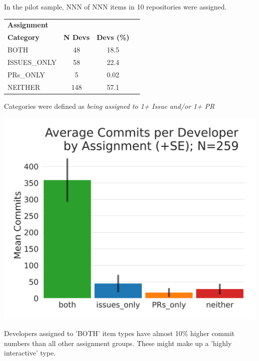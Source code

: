 \documentclass[25pt, a0paper, landscape, margin=10mm, innermargin=15mm, blockverticalspace=10mm, subcolspace=7mm, dvipsnames]{tikzposter} %
\begin{document}
\begin{columns}
{\begin{multicols}{2}
{    In the pilot sample, NNN of NNN items in 10 repositories were assigned.   
    \begin{center}
    \begin{tabular}{ l c c c} 
     \textbf{Assignment}\\ \textbf{Category} & \textbf{N Devs} & \textbf{Devs (\%)} \\
     BOTH & 48 & 18.5 \\ 
     ISSUES\_ONLY & 58 & 22.4 \\
     PRs\_ONLY & 5 & 0.02 \\
     NEITHER & 148 & 57.1 \\ 
    \end{tabular}
    \end{center}
    Categories were defined as \textit{being assigned to 1+ Issue and/or 1+ PR}
    \vspace*{0.4em} 
    \par
    
    \begin{tikzfigure}[]
            \includegraphics[width=0.95\linewidth]{Figures/bars-mean-commits.png}
        \end{tikzfigure}
    Developers assigned to 'BOTH' item types have almost 10\% higher commit numbers than all other assignment groups. 
    These might make up a 'highly interactive' type. 
    \vspace*{0.4em} 
    \par
    
}
\end{multicols}}
\end{columns}
\end{document}

